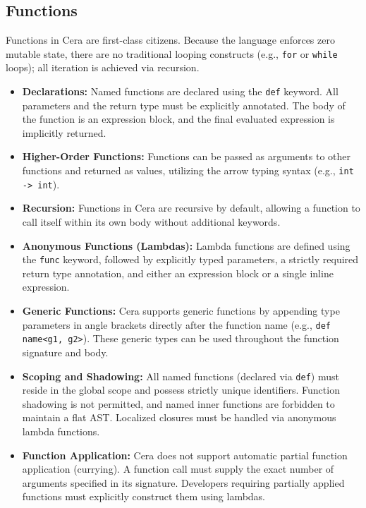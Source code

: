 \documentclass[11pt, a4paper]{article}
\begin{document}
\subsection{Functions}
\noindent
Functions in Cera are first-class citizens. Because the language enforces zero mutable state, there are no traditional looping constructs (e.g., \texttt{for} or \texttt{while} loops); all iteration is achieved via recursion. 

\begin{itemize}
    \item \textbf{Declarations:} Named functions are declared using the \texttt{def} keyword. All parameters and the return type must be explicitly annotated. The body of the function is an expression block, and the final evaluated expression is implicitly returned.
    \item \textbf{Higher-Order Functions:} Functions can be passed as arguments to other functions and returned as values, utilizing the arrow typing syntax (e.g., \texttt{int -> int}).
    \item \textbf{Recursion:} Functions in Cera are recursive by default, allowing a function to call itself within its own body without additional keywords.
    \item \textbf{Anonymous Functions (Lambdas):} Lambda functions are defined using the \texttt{func} keyword, followed by explicitly typed parameters, a strictly required return type annotation, and either an expression block or a single inline expression.
    \item \textbf{Generic Functions:} Cera supports generic functions by appending type parameters in angle brackets directly after the function name (e.g., \texttt{def name<g1, g2>}). These generic types can be used throughout the function signature and body.
    \item \textbf{Scoping and Shadowing:} All named functions (declared via \texttt{def}) must reside in the global scope and possess strictly unique identifiers. Function shadowing is not permitted, and named inner functions are forbidden to maintain a flat AST. Localized closures must be handled via anonymous lambda functions.
    \item \textbf{Function Application:} Cera does not support automatic partial function application (currying). A function call must supply the exact number of arguments specified in its signature. Developers requiring partially applied functions must explicitly construct them using lambdas.

\end{itemize}
\end{document}
